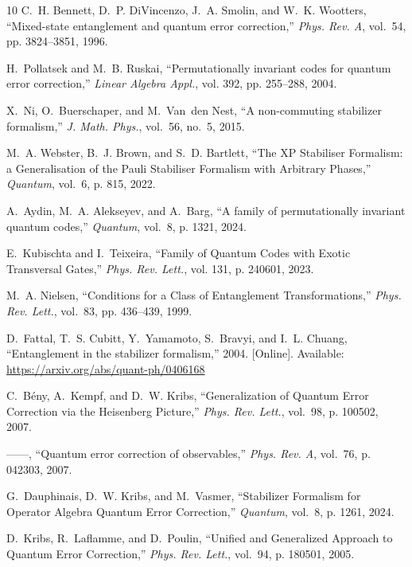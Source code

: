 \documentclass[]{amsart}
\begin{document}
\begin{thebibliography}{10}
C.~H. Bennett, D.~P. DiVincenzo, J.~A. Smolin, and W.~K. Wootters, ``{Mixed-state entanglement and quantum error correction},'' \emph{Phys. Rev. A}, vol.~54, pp. 3824--3851, 1996.

H.~Pollatsek and M.~B. Ruskai, ``{Permutationally invariant codes for quantum error correction},'' \emph{Linear Algebra Appl.}, vol. 392, pp. 255--288, 2004.

X.~Ni, O.~Buerschaper, and M.~Van~den Nest, ``{A non-commuting stabilizer formalism},'' \emph{J. Math. Phys.}, vol.~56, no.~5, 2015.

M.~A. Webster, B.~J. Brown, and S.~D. Bartlett, ``{The {XP} {S}tabiliser {F}ormalism: a {G}eneralisation of the {P}auli {S}tabiliser {F}ormalism with {A}rbitrary {P}hases},'' \emph{{Quantum}}, vol.~6, p. 815, 2022.

A.~Aydin, M.~A. Alekseyev, and A.~Barg, ``{A family of permutationally invariant quantum codes},'' \emph{{Quantum}}, vol.~8, p. 1321, 2024.

E.~Kubischta and I.~Teixeira, ``{Family of Quantum Codes with Exotic Transversal Gates},'' \emph{Phys. Rev. Lett.}, vol. 131, p. 240601, 2023.

M.~A. Nielsen, ``{Conditions for a Class of Entanglement Transformations},'' \emph{Phys. Rev. Lett.}, vol.~83, pp. 436--439, 1999.

\BIBentryALTinterwordspacing
D.~Fattal, T.~S. Cubitt, Y.~Yamamoto, S.~Bravyi, and I.~L. Chuang, ``{Entanglement in the stabilizer formalism},'' 2004. [Online]. Available: \url{https://arxiv.org/abs/quant-ph/0406168}
\BIBentrySTDinterwordspacing

C.~B\'eny, A.~Kempf, and D.~W. Kribs, ``{Generalization of Quantum Error Correction via the Heisenberg Picture},'' \emph{Phys. Rev. Lett.}, vol.~98, p. 100502, 2007.

------, ``{Quantum error correction of observables},'' \emph{Phys. Rev. A}, vol.~76, p. 042303, 2007.

G.~Dauphinais, D.~W. Kribs, and M.~Vasmer, ``{Stabilizer Formalism for Operator Algebra Quantum Error Correction},'' \emph{Quantum}, vol.~8, p. 1261, 2024.

D.~Kribs, R.~Laflamme, and D.~Poulin, ``{Unified and Generalized Approach to Quantum Error Correction},'' \emph{Phys. Rev. Lett.}, vol.~94, p. 180501, 2005.


\end{thebibliography}
\end{document}
